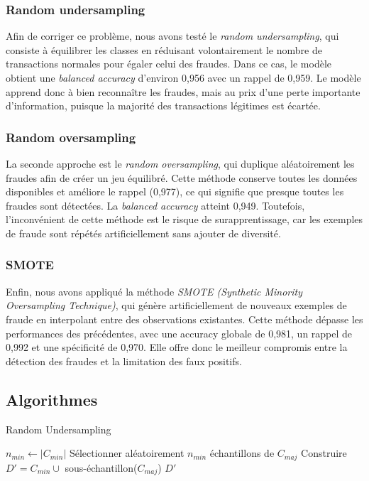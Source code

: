 \documentclass{article}
\begin{document}
\subsubsection*{Random undersampling}
Afin de corriger ce problème, nous avons testé le \textit{random undersampling}, qui consiste à équilibrer les classes en réduisant volontairement le nombre de transactions normales pour égaler celui des fraudes.
Dans ce cas, le modèle obtient une \textit{balanced accuracy} d’environ 0,956 avec un rappel de 0,959.
Le modèle apprend donc à bien reconnaître les fraudes, mais au prix d’une perte importante d’information, puisque la majorité des transactions légitimes est écartée.

\subsubsection*{Random oversampling}
La seconde approche est le \textit{random oversampling}, qui duplique aléatoirement les fraudes afin de créer un jeu équilibré.
Cette méthode conserve toutes les données disponibles et améliore le rappel (0,977), ce qui signifie que presque toutes les fraudes sont détectées.
La \textit{balanced accuracy} atteint 0,949.
Toutefois, l’inconvénient de cette méthode est le risque de surapprentissage, car les exemples de fraude sont répétés artificiellement sans ajouter de diversité.

\subsubsection*{SMOTE}
Enfin, nous avons appliqué la méthode \textit{SMOTE (Synthetic Minority Oversampling Technique)}, qui génère artificiellement de nouveaux exemples de fraude en interpolant entre des observations existantes.
Cette méthode dépasse les performances des précédentes, avec une accuracy globale de 0,981, un rappel de 0,992 et une spécificité de 0,970.
Elle offre donc le meilleur compromis entre la détection des fraudes et la limitation des faux positifs.


\vspace{1cm}


\subsection{Algorithmes}

\begin{algorithm}[H]
\caption{Random Undersampling}

$n_{min} \gets |C_{min}|$ \;
Sélectionner aléatoirement $n_{min}$ échantillons de $C_{maj}$\;
Construire $D' = C_{min} \cup$ sous-échantillon($C_{maj}$)\;
\Return $D'$\;
\end{algorithm}
\end{document}
